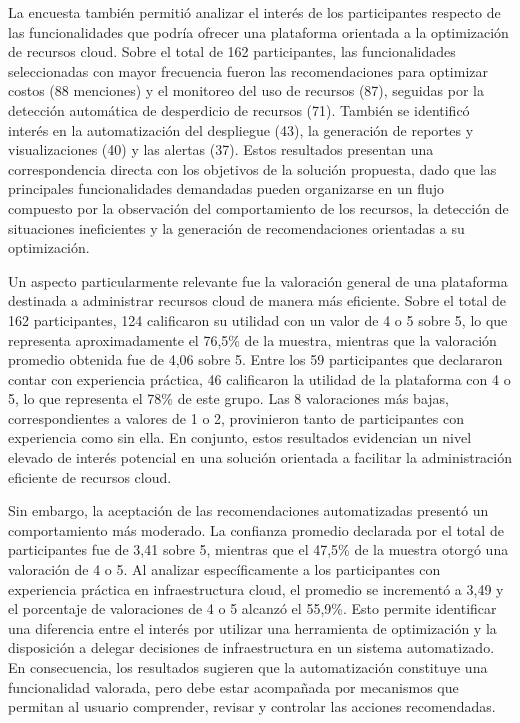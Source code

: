 \documentclass[a4paper, 12pt, oneside, openany]{book}
\begin{document}
La encuesta también permitió analizar el interés de los participantes respecto de las funcionalidades que podría ofrecer una plataforma orientada a la optimización de recursos cloud. Sobre el total de 162 participantes, las funcionalidades seleccionadas con mayor frecuencia fueron las recomendaciones para optimizar costos (88 menciones) y el monitoreo del uso de recursos (87), seguidas por la detección automática de desperdicio de recursos (71). También se identificó interés en la automatización del despliegue (43), la generación de reportes y visualizaciones (40) y las alertas (37). Estos resultados presentan una correspondencia directa con los objetivos de la solución propuesta, dado que las principales funcionalidades demandadas pueden organizarse en un flujo compuesto por la observación del comportamiento de los recursos, la detección de situaciones ineficientes y la generación de recomendaciones orientadas a su optimización.

Un aspecto particularmente relevante fue la valoración general de una plataforma destinada a administrar recursos cloud de manera más eficiente. Sobre el total de 162 participantes, 124 calificaron su utilidad con un valor de 4 o 5 sobre 5, lo que representa aproximadamente el 76,5\% de la muestra, mientras que la valoración promedio obtenida fue de 4,06 sobre 5. Entre los 59 participantes que declararon contar con experiencia práctica, 46 calificaron la utilidad de la plataforma con 4 o 5, lo que representa el 78\% de este grupo. Las 8 valoraciones más bajas, correspondientes a valores de 1 o 2, provinieron tanto de participantes con experiencia como sin ella. En conjunto, estos resultados evidencian un nivel elevado de interés potencial en una solución orientada a facilitar la administración eficiente de recursos cloud.

Sin embargo, la aceptación de las recomendaciones automatizadas presentó un comportamiento más moderado. La confianza promedio declarada por el total de participantes fue de 3,41 sobre 5, mientras que el 47,5\% de la muestra otorgó una valoración de 4 o 5. Al analizar específicamente a los participantes con experiencia práctica en infraestructura cloud, el promedio se incrementó a 3,49 y el porcentaje de valoraciones de 4 o 5 alcanzó el 55,9\%. Esto permite identificar una diferencia entre el interés por utilizar una herramienta de optimización y la disposición a delegar decisiones de infraestructura en un sistema automatizado. En consecuencia, los resultados sugieren que la automatización constituye una funcionalidad valorada, pero debe estar acompañada por mecanismos que permitan al usuario comprender, revisar y controlar las acciones recomendadas.
\end{document}
